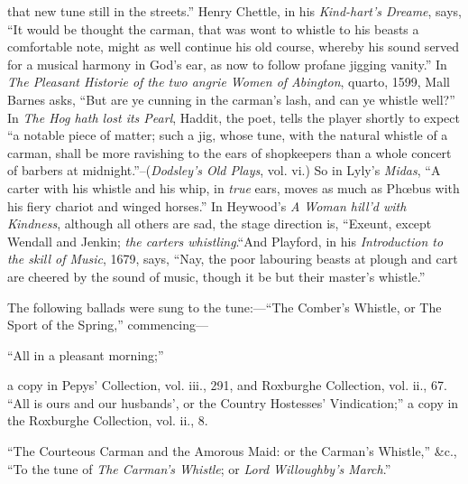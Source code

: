 that new tune still in the streets.” Henry Chettle, in his \textit{Kind-hart’s
Dreame}, says, “It would be thought the carman, that was wont to whistle to his
beasts a comfortable note, might as well continue his old course, whereby his
sound served for a musical harmony in God’s ear, as now to follow profane
jigging vanity.” In\textit{ The Pleasant Historie of the two angrie Women of Abington},
quarto, 1599, Mall Barnes asks, “But are ye cunning in the carman’s lash, and
can ye whistle well?” In \textit{The Hog hath lost its Pearl}, Haddit, the poet, tells the
player shortly to expect “a notable piece of matter; such a jig, whose tune, with
the natural whistle of a carman, shall be more ravishing to the ears of shopkeepers
than a whole concert of barbers at midnight.”--(\textit{Dodsley’s Old Plays},
vol. vi.) So in Lyly’s \textit{Midas}, “A carter with his whistle and his whip, in \textit{true}
ears, moves as much as Phœbus with his fiery chariot and winged horses.” In
Heywood’s \textit{A Woman hill’d with Kindness}, although all others are sad, the stage
direction is, “Exeunt, except Wendall and Jenkin; \textit{the carters whistling}.“And
Playford, in his \textit{Introduction to the skill of Music}, 1679, says, “Nay, the poor
labouring beasts at plough and cart are cheered by the sound of music, though it
be but their master’s whistle.”
\pagebreak

The following ballads were sung to the tune:—“The Comber’s Whistle, or The
Sport of the Spring,” commencing—
\settowidth{\versewidth}{“All in a pleasant morning;”}
\begin{scverse}
“All in a pleasant morning;”
\end{scverse}
a copy in Pepys’ Collection, vol. iii., 291, and Roxburghe Collection, vol. ii., 67.
“All is ours and our husbands’, or the Country Hostesses’ Vindication;” a copy
in the Roxburghe Collection, vol. ii., 8.

“The Courteous Carman and the Amorous Maid: or the Carman’s Whistle,”
\&c., “To the tune of \textit{The Carman's Whistle}; or \textit{Lord Willoughby's March}.”



